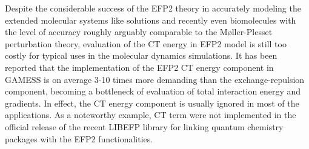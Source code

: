 Despite the considerable success of the EFP2 theory
in accurately modeling the extended molecular systems 
like solutions and recently even biomolecules
with the level of accuracy
roughly arguably comparable to the M{\o}ller\hyp{}Plesset perturbation theory,
evaluation of the CT energy in EFP2 model is still too costly for
typical uses in the
molecular dynamics simulations. It has been reported that 
the implementation of the EFP2 CT energy component in GAMESS
is on average 3-10 times more demanding than the exchange\hyp{}repulsion
component, becoming a bottleneck of evaluation of total interaction 
energy and gradients.\cite{Gordon.Smith.Xu.Slipchenko.AnnuRevPhysChem.2013,
Li.Gordon.Jensen.JCP.2006}
In effect, the CT energy component is usually ignored in most of the applications. 
As a noteworthy example, 
CT term were not implemented in the official release 
of the recent LIBEFP library for linking quantum chemistry packages 
with the EFP2 functionalities.\cite{Kaliman.Slipchenko.JCC.2015}


